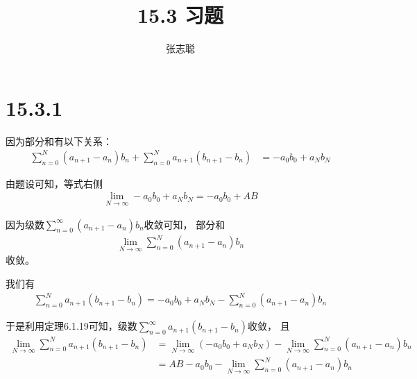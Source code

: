\documentclass{article}
\begin{document}
\title{15.3 习题}
\author{张志聪}
\maketitle

\section*{15.3.1}

因为部分和有以下关系：
\begin{align*}
  \sum\limits_{n = 0}^N (a_{n + 1} - a_n)b_n + \sum\limits_{n = 0}^N a_{n + 1}(b_{n + 1} - b_n)
   & = - a_0b_0 + a_Nb_N
\end{align*}

由题设可知，等式右侧
\begin{align*}
  \lim\limits_{N \to \infty} - a_0b_0 + a_Nb_N = - a_0b_0 + AB
\end{align*}

因为级数$\sum\limits_{n = 0}^\infty (a_{n + 1} - a_n)b_n$收敛可知，
部分和
\begin{align*}
  \lim\limits_{N \to \infty} \sum\limits_{n = 0}^N (a_{n + 1} - a_n)b_n
\end{align*}
收敛。

我们有
\begin{align*}
  \sum\limits_{n = 0}^N a_{n + 1}(b_{n + 1} - b_n) = - a_0b_0 + a_Nb_N - \sum\limits_{n = 0}^N (a_{n + 1} - a_n)b_n
\end{align*}

于是利用定理6.1.19可知，级数$\sum\limits_{n = 0}^\infty a_{n + 1}(b_{n + 1} - b_n)$收敛，
且
\begin{align*}
  \lim\limits_{N \to \infty} \sum\limits_{n = 0}^N a_{n + 1}(b_{n + 1} - b_n)
   & = \lim\limits_{N \to \infty} (- a_0b_0 + a_Nb_N) - \lim\limits_{N \to \infty} \sum\limits_{n = 0}^N (a_{n + 1} - a_n)b_n \\
   & = AB - a_0b_0 - \lim\limits_{N \to \infty} \sum\limits_{n = 0}^N (a_{n + 1} - a_n)b_n
\end{align*}
\end{document}
